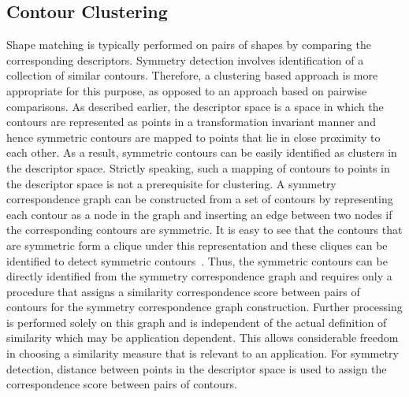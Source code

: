 \documentclass[review,journal]{vgtc}         %
\begin{document}
\subsection{Contour Clustering}
Shape matching is typically performed on pairs of shapes by comparing the corresponding descriptors. 
Symmetry detection involves identification of a collection of similar contours. Therefore, 
a clustering based approach is more appropriate for this purpose, 
as opposed to an approach based on pairwise comparisons.
As described earlier, the descriptor space is a space in which the contours are represented as 
points in a transformation invariant manner and hence symmetric contours are mapped to points 
that lie in close proximity to each other. As a result, symmetric contours can be easily 
identified as clusters in the descriptor space. Strictly speaking, such a mapping of contours to points in the
descriptor space is not a prerequisite for clustering. A symmetry correspondence
graph can be constructed from a set of contours by representing each contour
as a node in the graph and inserting an edge between two nodes if the corresponding
contours are symmetric. It is easy to see that the contours that are symmetric form
a clique under this representation and these cliques can be identified to detect
symmetric contours~\cite{Lip10}. Thus, the symmetric contours can be directly identified 
from the symmetry correspondence graph and requires only a procedure that assigns a similarity 
correspondence score between pairs of contours for the symmetry correspondence graph construction.
Further processing is performed solely on this graph and is independent
of the actual definition of similarity which may be application dependent. This allows
considerable freedom in choosing a similarity measure that is relevant to an application.
For symmetry detection, distance between points in the descriptor space is 
used to assign the correspondence score between pairs of contours. 
\end{document}

